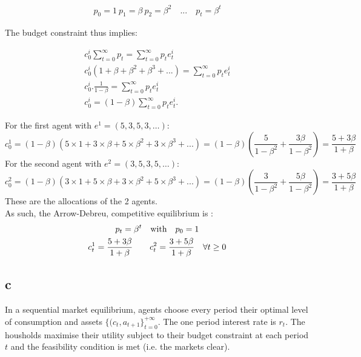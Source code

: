 \documentclass{article}
\begin{document}
\begin{gather*}
p_{0}=1 \ p_{1}=\beta \ p_{2}=\beta^{2}\quad ...\quad p_{t}=\beta ^{t}
\end{gather*}

The budget constraint thus implies:

\begin{gather*}
    c^{i}_{0}\sum^{\infty }_{t=0} p_{t}=\sum^{\infty }_{t=0} p_{t}e^{i}_{t}\\
    c^{i}_{0}\left( 1+\beta +\beta^{2} +\beta^{3} +...\right)  =\sum^{\infty }_{t=0} p_{t}e^{i}_{t}\\
    c^{i}_{0}.\frac{1}{1-\beta}  =\sum^{\infty }_{t=0} p_{t}e^{i}_{t}\\
c^{i}_{0}=\left( 1-\beta \right)  \sum^{\infty }_{t=0} p_{t}e^{i}_{t}.
\end{gather*}

For the first agent with $e^{1}=(5,3,5,3, \hdots )$:
\[
c^{1}_{0}=\left( 1-\beta \right)  \left( 5\times 1+3\times \beta +5\times \beta^{2} +3\times \beta^{3} +...\right)  =\left( 1-\beta \right)  (\frac{5}{1-\beta^{2} } +\frac{3\beta }{1-\beta^{2} } )=\frac{5+3\beta }{1+\beta } 
\]
For the second agent with $e^{2}=(3,5,3,5, \hdots)$:
\[
c^{2}_{0}=\left( 1-\beta \right)  \left( 3\times 1+5\times \beta +3\times \beta^{2} +5\times \beta^{3} +...\right)  =\left( 1-\beta \right)  (\frac{3}{1-\beta^{2} } +\frac{5\beta }{1-\beta^{2} } )=\frac{3+5\beta }{1+\beta } 
\]
These are the allocations of the 2 agents.\\

As such, the Arrow-Debreu, competitive equilibrium is :
\begin{gather*}
    p_t=\beta^t\quad\mbox{with}\quad p_0=1\\
    c_t^1=\frac{5+3\beta}{1+\beta} \quad\mbox\quad c_t^2=\frac{3+5\beta}{1+\beta}\quad\forall t \geq 0
\end{gather*}

\subsection{c}

In a sequential market equilibrium, agents choose every period their optimal level of consumption and assets $\{(c_t, a_{t+1}\}^{+\infty}_{t=0}$. The one period interest rate is $r_t$. The housholds maximise their utility subject to their budget constraint at each period $t$ and the feasibility condition is met (i.e. the markets clear).\\
\end{document}
